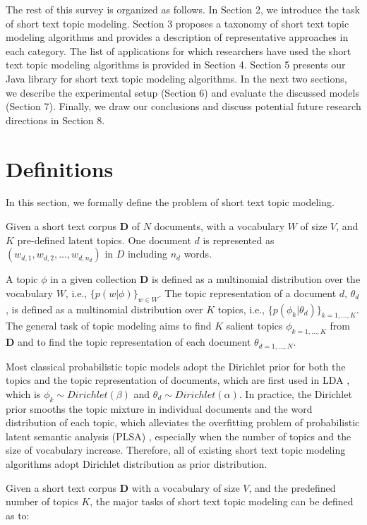 \documentclass[10pt,journal,compsoc]{IEEEtran}
\begin{document}
The rest of this survey is organized as follows. In Section 2, we introduce the task of short text topic modeling. Section 3 proposes a taxonomy of short text topic modeling algorithms and provides a description of representative approaches in each category. The list of applications for which researchers have used the short text topic modeling algorithms is provided in Section 4. Section 5 presents our Java library for short text topic modeling algorithms. In the next two sections, we describe the experimental setup (Section 6) and evaluate the discussed models (Section 7).  Finally, we draw our conclusions and discuss potential future research directions in Section 8.


\section{Definitions}

In this section, we formally define the problem of short text topic modeling. 

Given a short text corpus $\bm{D}$ of $N$ documents, with a vocabulary $W$ of size $V$, and $K$ pre-defined latent topics. One document $d$ is represented as $(w_{d,1},w_{d,2},...,w_{d,n_d})$ in $D$ including $n_d$ words.

A topic $\phi$ in a given collection $\bm{D}$ is defined as a multinomial distribution over the vocabulary $W$, i.e., $\{p(w|\phi)\}_{w\in W}$. The topic representation of a document $d$, $\theta_d$, is defined as a multinomial distribution over $K$ topics, i.e., $\{p(\phi_k|\theta_d)\}_{k=1,...,K}$. The general task of topic modeling aims to find $K$ salient topics $\phi_{k=1,...,K}$ from $\bm{D}$ and to find the topic representation of each document $\theta_{d=1,...,N}$. 

Most classical probabilistic topic models adopt the Dirichlet prior for both the topics and the topic representation of documents, which are first used in LDA \cite{blei2003latent}, which is $\phi_k \sim Dirichlet(\beta)$ and $\theta_d \sim Dirichlet(\alpha)$. In practice, the Dirichlet prior smooths the topic mixture in individual documents and the word distribution of each topic, which alleviates the overfitting problem of probabilistic latent semantic analysis (PLSA) \cite{hofmann1999probabilistic}, especially when the number of topics and the size of vocabulary increase. Therefore, all of existing short text topic modeling algorithms adopt Dirichlet distribution as prior distribution. 

Given a short text corpus $\bm{D}$ with a vocabulary of size $V$, and the predefined number of topics $K$, the major tasks of short text topic modeling can be defined as to:
\end{document}
